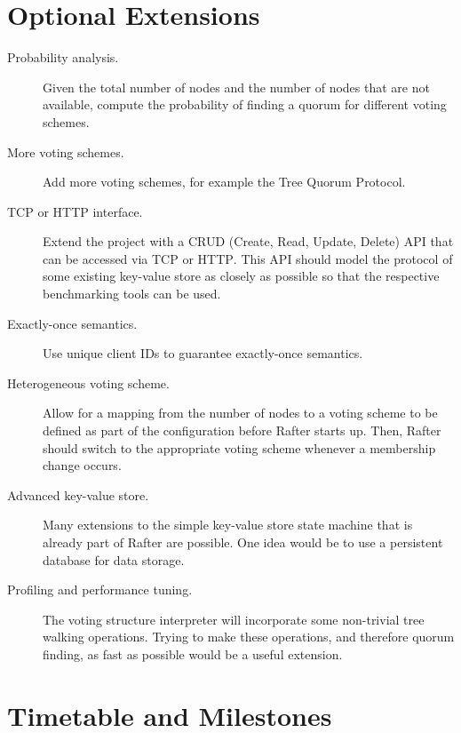 \documentclass[12pt]{scrartcl}
\begin{document}
\section{Optional Extensions%
  \label{optional-extensions}%
}
%
\begin{description}

\item[Probability analysis.] Given the total number of nodes and the number of nodes that are not available, compute the probability of finding a quorum for different voting schemes.

\item[More voting schemes.] Add more voting schemes, for example the Tree Quorum Protocol.

\item[\textsc{TCP} or \textsc{HTTP} interface.] Extend the project with a \textsc{CRUD} (Create, Read, Update, Delete) \textsc{API} that can be accessed via \textsc{TCP} or \textsc{HTTP}. This \textsc{API} should model the protocol of some existing key-value store as closely as possible so that the respective benchmarking tools can be used.

\item[Exactly-once semantics.] Use unique client IDs to guarantee exactly-once semantics.

\item[Heterogeneous voting scheme.] Allow for a mapping from the number of nodes to a voting scheme to be defined as part of the configuration before Rafter starts up. Then, Rafter should switch to the appropriate voting scheme whenever a membership change occurs.

\item[Advanced key-value store.] Many extensions to the simple key-value store state machine that is already part of Rafter are possible. One idea would be to use a persistent database for data storage.

\item[Profiling and performance tuning.] The voting structure interpreter will incorporate some non-trivial tree walking operations. Trying to make these operations, and therefore quorum finding, as fast as possible would be a useful extension.

\end{description}


\section{Timetable and Milestones%
  \label{timetable-and-milestones}%
}
\end{document}
